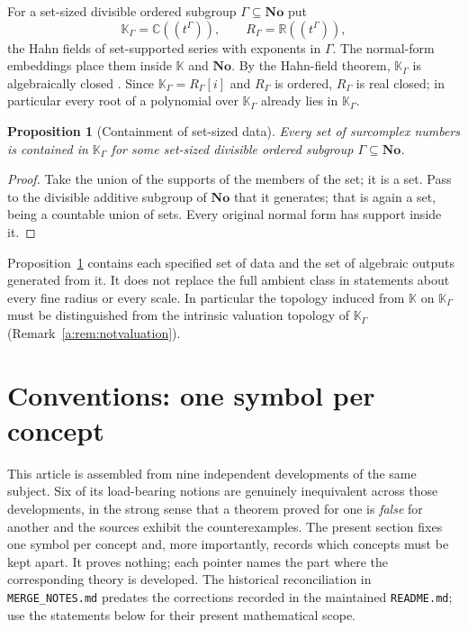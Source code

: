 \documentclass[11pt,a4paper]{article}
\numberwithin{equation}{section}
\newtheorem{proposition}[theorem]{Proposition}
\theoremstyle{definition}
\theoremstyle{remark}
\theoremstyle{plain}
\newcommand{\K}{\mathbb K}
\newcommand{\No}{\mathbf{No}}
\newcommand{\CC}{\mathbb C}
\newcommand{\RR}{\mathbb R}
\newcommand{\tm}{t}
\begin{document}
For a set-sized divisible ordered subgroup $\Gamma\subseteq\No$ put
\[
 \K_\Gamma=\CC((\tm^{\Gamma})),\qquad
 R_\Gamma=\RR((\tm^{\Gamma})),
\]
the Hahn fields of set-supported series with exponents in $\Gamma$.  The
normal-form embeddings place them inside $\K$ and $\No$.  By the
Hahn-field theorem, $\K_\Gamma$ is algebraically closed
\cite[Corollary~4, p.~10 of the author PDF]{Poonen}. Since
$\K_\Gamma=R_\Gamma[i]$ and $R_\Gamma$ is ordered, $R_\Gamma$ is
real closed; in particular every root of a polynomial over
$\K_\Gamma$ already lies in $\K_\Gamma$.

\begin{proposition}[Containment of set-sized data]\label{a:prop:fragment}
Every \emph{set} of surcomplex numbers is contained in $\K_\Gamma$ for
some set-sized divisible ordered subgroup $\Gamma\subseteq\No$.
\end{proposition}

\begin{proof}
Take the union of the supports of the members of the set; it is a set.
Pass to the divisible additive subgroup of $\No$ that it generates;
that is again a set, being a countable union of sets.  Every original
normal form has support inside it.
\end{proof}

Proposition~\ref{a:prop:fragment} contains each specified set of data
and the set of algebraic outputs generated from it. It does not replace
the full ambient class in statements about every fine radius or every
scale. In particular the topology induced from $\K$ on $\K_\Gamma$
must be distinguished from the intrinsic valuation topology of
$\K_\Gamma$ (Remark~\ref{a:rem:notvaluation}).

\section{Conventions: one symbol per concept}\label{a:sec:conventions}

This article is assembled from nine independent developments of the same
subject.  Six of its load-bearing notions are genuinely inequivalent
across those developments, in the strong sense that a theorem proved for
one is \emph{false} for another and the sources exhibit the
counterexamples.  The present section fixes one symbol per concept and,
more importantly, records which concepts must be kept apart.  It proves
nothing; each pointer names the part where the corresponding theory is
developed. The historical reconciliation in \texttt{MERGE\_NOTES.md}
predates the corrections recorded in the maintained \texttt{README.md};
use the statements below for their present mathematical scope.
\end{document}
